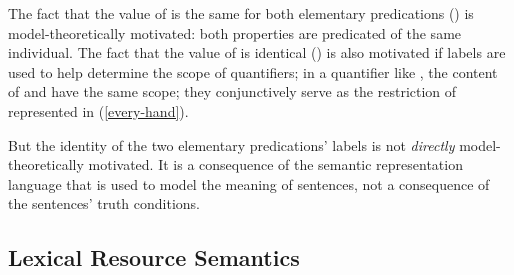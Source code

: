\documentclass[output=paper
	        ,collection
	        ,collectionchapter
 	        ,biblatex
                ,babelshorthands
                ,newtxmath
                ,draftmode
                ,colorlinks, citecolor=brown
]{langscibook}
\begin{document}
\begin{exe}
\ex\label{int-mod}
\end{exe}

The fact that the value of  is the same for both elementary predications () is model-theoretically motivated: both properties are predicated of the same individual. 
The fact that the value of  is identical () is also motivated if labels are used to help determine the scope of quantifiers; in a quantifier like , the content of  and  have the same scope; they conjunctively serve as the restriction of  represented in  (\ref{every-hand}).

\begin{exe}
\ex\label{every-hand}
\end{exe}

 But the identity of the two elementary predications' labels is not \emph{directly} model-theoretically motivated. It is a consequence of the semantic representation language that is used to model the meaning of sentences, not a consequence of the sentences' truth conditions.



\subsection{Lexical Resource Semantics}
\end{document}
